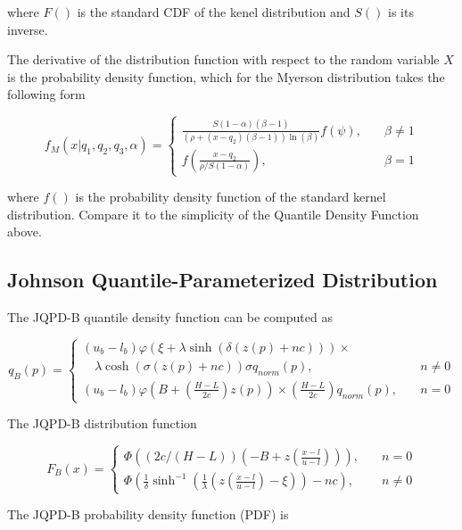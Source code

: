 \documentclass[
]{interact}
\begin{document}
where \(F()\) is the standard CDF of the kenel distribution and \(S()\)
is its inverse.

The derivative of the distribution function with respect to the random
variable \(X\) is the probability density function, which for the
Myerson distribution takes the following form

\[
f_M(x\vert q_1, q_2, q_3, \alpha)=\begin{cases}
\frac{S(1-\alpha)(\beta-1)}{(\rho+(x-q_2)(\beta-1))\ln(\beta)}f(\psi), \quad &\beta\neq1\\
f\left(\frac{x-q_2}{\rho/S(1-\alpha)}\right),\quad &\beta=1
\end{cases}
\]

where \(f()\) is the probability density function of the standard kernel
distribution. Compare it to the simplicity of the Quantile Density
Function above.

\subsection*{Johnson Quantile-Parameterized
Distribution}\label{johnson-quantile-parameterized-distribution-1}

The JQPD-B quantile density function can be computed as

\[
q_B(p)=\begin{cases}
(u_b-l_b)\varphi(\xi+\lambda\sinh(\delta(z(p)+nc))) \times\\
\quad \lambda\cosh(\sigma(z(p)+nc)) \sigma q_{norm}(p), \quad &n\neq 0\\
(u_b-l_b)\varphi\left(B+\left(\frac{H-L}{2c}\right)z(p)\right)
\times \left(\frac{H-L}{2c}\right)q_{norm}(p), \quad &n=0
\end{cases}
\]

The JQPD-B distribution function

\[
F_B(x)=\begin{cases}
\Phi\left((2c/(H-L))(-B+z\left(\frac{x-l}{u-l}\right))\right), \quad &n=0 \\
\Phi\left(\frac{1}{\delta}\sinh^{-1}\left(\frac{1}{\lambda}\left(z\left(\frac{x-l}{u-l}\right)-\xi\right)\right)-nc\right), \quad &n\neq0
\end{cases}
\]

The JQPD-B probability density function (PDF) is
\end{document}
